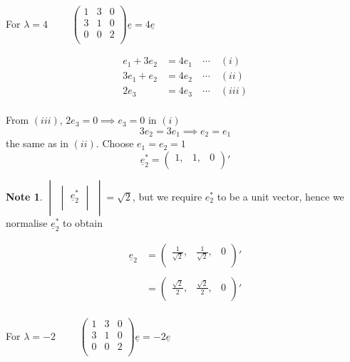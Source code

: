 \documentclass[11pt,a4paper]{article}
\theoremstyle{definition}
\newtheorem{note}[thm]{Note}
\begin{document}
\begin{enumerate}
\begin{enumerate}
For $\lambda = 4$ $\qquad  \begin{pmatrix}
1 & 3 & 0\\
3 & 1 & 0\\
0 & 0 & 2\\
\end{pmatrix}\underline{e} =4\underline{e}$

\begin{align*}
e_1 + 3e_2 & = 4e_1 \quad \cdots\quad  (i)\\
3e_1 + e_2 & = 4e_2 \quad \cdots\quad  (ii)\\
2e_3 & = 4e_3       \quad  \cdots\quad  (iii)\\
\end{align*}

From $(iii)$, $2e_3 = 0 \implies e_3 = 0$ in $(i)$ $$3e_2 = 3e_1 \implies e_2 = e_1$$ the same as in $(ii)$. Choose $e_1 = e_2 = 1$ $$\underline{e}^*_2 = \begin{pmatrix}
1, & 1, & 0\\
\end{pmatrix}'$$
\begin{note}
$\begin{vmatrix}
\begin{vmatrix}
\underline{e}_2^*\\
\end{vmatrix}
\end{vmatrix} = \sqrt{2}$, but we require $e^*_2$ to be a unit vector, hence we normalise $\underline{e}^*_2$ to obtain
\end{note}
\begin{align*}
\underline{e}_2 & = \begin{pmatrix}
\frac{1}{\sqrt{2}}, & \frac{1}{\sqrt{2}}, & 0\\
\end{pmatrix}'\\\\
& = \begin{pmatrix}
\frac{\sqrt{2}}{2}, & \frac{\sqrt{2}}{2}, & 0 \\
\end{pmatrix}'\\
\end{align*}


For $\lambda = -2\qquad $ $\begin{pmatrix}
1 & 3 & 0\\
3 & 1 & 0\\
0 & 0 & 2\\
\end{pmatrix}\underline{e} = -2\underline{e}$



\end{enumerate}
\end{enumerate}
\end{document}
